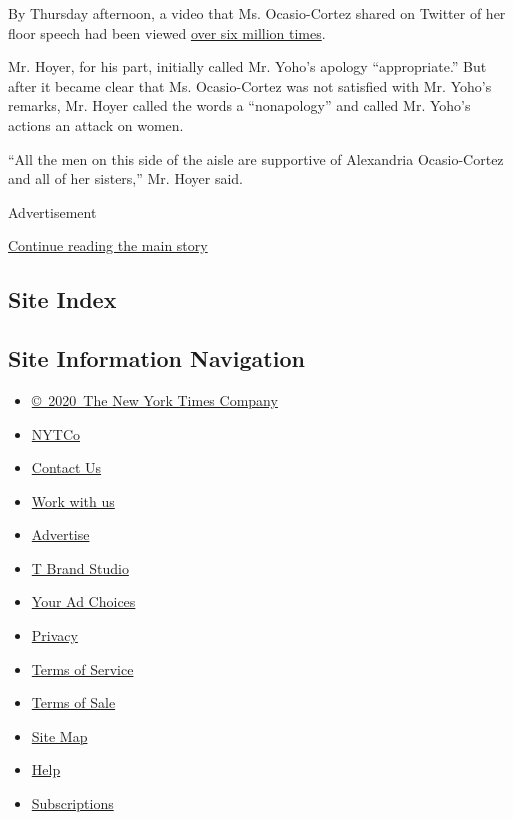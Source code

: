 By Thursday afternoon, a video that Ms. Ocasio-Cortez shared on Twitter
of her floor speech had been viewed
\href{https://twitter.com/AOC/status/1286341062651523076?s=20}{over six
million times}.

Mr. Hoyer, for his part, initially called Mr. Yoho's apology
``appropriate.'' But after it became clear that Ms. Ocasio-Cortez was
not satisfied with Mr. Yoho's remarks, Mr. Hoyer called the words a
``nonapology'' and called Mr. Yoho's actions an attack on women.

``All the men on this side of the aisle are supportive of Alexandria
Ocasio-Cortez and all of her sisters,'' Mr. Hoyer said.

Advertisement

\protect\hyperlink{after-bottom}{Continue reading the main story}

\hypertarget{site-index}{%
\subsection{Site Index}\label{site-index}}

\hypertarget{site-information-navigation}{%
\subsection{Site Information
Navigation}\label{site-information-navigation}}

\begin{itemize}
\tightlist
\item
  \href{https://help.nytimes.com/hc/en-us/articles/115014792127-Copyright-notice}{©~2020~The
  New York Times Company}
\end{itemize}

\begin{itemize}
\tightlist
\item
  \href{https://www.nytco.com/}{NYTCo}
\item
  \href{https://help.nytimes.com/hc/en-us/articles/115015385887-Contact-Us}{Contact
  Us}
\item
  \href{https://www.nytco.com/careers/}{Work with us}
\item
  \href{https://nytmediakit.com/}{Advertise}
\item
  \href{http://www.tbrandstudio.com/}{T Brand Studio}
\item
  \href{https://www.nytimes.com/privacy/cookie-policy\#how-do-i-manage-trackers}{Your
  Ad Choices}
\item
  \href{https://www.nytimes.com/privacy}{Privacy}
\item
  \href{https://help.nytimes.com/hc/en-us/articles/115014893428-Terms-of-service}{Terms
  of Service}
\item
  \href{https://help.nytimes.com/hc/en-us/articles/115014893968-Terms-of-sale}{Terms
  of Sale}
\item
  \href{https://spiderbites.nytimes.com}{Site Map}
\item
  \href{https://help.nytimes.com/hc/en-us}{Help}
\item
  \href{https://www.nytimes.com/subscription?campaignId=37WXW}{Subscriptions}
\end{itemize}
